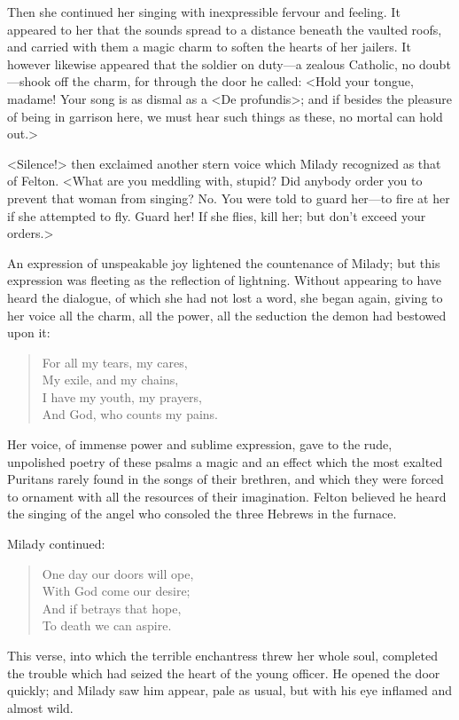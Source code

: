 Then she continued her singing with inexpressible fervour and feeling. It appeared to her that the sounds spread to a distance beneath the vaulted roofs, and carried with them a magic charm to soften the hearts of her jailers. It however likewise appeared that the soldier on duty—a zealous Catholic, no doubt—shook off the charm, for through the door he called: <Hold your tongue, madame! Your song is as dismal as a <De profundis>; and if besides the pleasure of being in garrison here, we must hear such things as these, no mortal can hold out.> 

<Silence!> then exclaimed another stern voice which Milady recognized as that of Felton. <What are you meddling with, stupid? Did anybody order you to prevent that woman from singing? No. You were told to guard her—to fire at her if she attempted to fly. Guard her! If she flies, kill her; but don't exceed your orders.> 

An expression of unspeakable joy lightened the countenance of Milady; but this expression was fleeting as the reflection of lightning. Without appearing to have heard the dialogue, of which she had not lost a word, she began again, giving to her voice all the charm, all the power, all the seduction the demon had bestowed upon it: 

\begin{verse}
	For all my tears, my cares,\\
	My exile, and my chains,\\
	I have my youth, my prayers,\\
	And God, who counts my pains.
\end{verse}

Her voice, of immense power and sublime expression, gave to the rude, unpolished poetry of these psalms a magic and an effect which the most exalted Puritans rarely found in the songs of their brethren, and which they were forced to ornament with all the resources of their imagination. Felton believed he heard the singing of the angel who consoled the three Hebrews in the furnace. 

Milady continued: 

\begin{verse}
One day our doors will ope,\\
With God come our desire;\\
And if betrays that hope,\\
To death we can aspire.
	\end{verse}


This verse, into which the terrible enchantress threw her whole soul, completed the trouble which had seized the heart of the young officer. He opened the door quickly; and Milady saw him appear, pale as usual, but with his eye inflamed and almost wild. 

